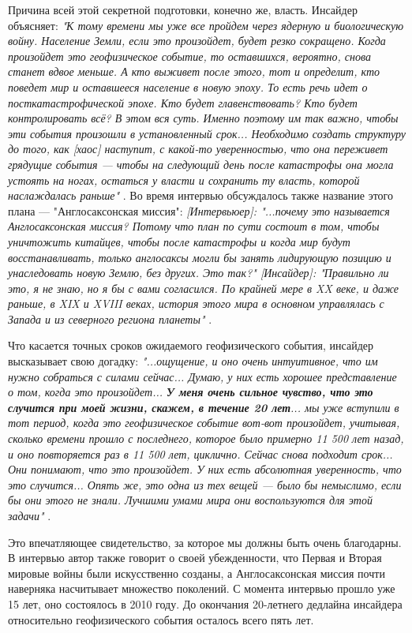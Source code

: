 \documentclass[10pt,twocolumn,letterpaper]{article}
\begin{document}
Причина всей этой секретной подготовки, конечно же, власть. Инсайдер объясняет: \textit{"К тому времени мы уже все пройдем через ядерную и биологическую войну. Население Земли, если это произойдет, будет резко сокращено. Когда произойдет это геофизическое событие, то оставшихся, вероятно, снова станет вдвое меньше. А кто выживет после этого, тот и определит, кто поведет мир и оставшееся население в новую эпоху. То есть речь идет о посткатастрофической эпохе. Кто будет главенствовать? Кто будет контролировать всё? В этом вся суть. Именно поэтому им так важно, чтобы эти события произошли в установленный срок... Необходимо создать структуру до того, как [хаос] наступит, с какой-то уверенностью, что она переживет грядущие события — чтобы на следующий день после катастрофы она могла устоять на ногах, остаться у власти и сохранить ту власть, которой наслаждалась раньше"} \cite{4}. Во время интервью обсуждалось также название этого плана — "Англосаксонская миссия": \textit{[Интервьюер]: "...почему это называется Англосаксонская миссия? Потому что план по сути состоит в том, чтобы уничтожить китайцев, чтобы после катастрофы и когда мир будут восстанавливать, только англосаксы могли бы занять лидирующую позицию и унаследовать новую Землю, без других. Это так?" [Инсайдер]: "Правильно ли это, я не знаю, но я бы с вами согласился. По крайней мере в XX веке, и даже раньше, в XIX и XVIII веках, история этого мира в основном управлялась с Запада и из северного региона планеты"} \cite{4}.

Что касается точных сроков ожидаемого геофизического события, инсайдер высказывает свою догадку: \textit{"...ощущение, и оно очень интуитивное, что им нужно собраться с силами сейчас... Думаю, у них есть хорошее представление о том, когда это произойдет... \textbf{У меня очень сильное чувство, что это случится при моей жизни, скажем, в течение 20 лет}... мы уже вступили в тот период, когда это геофизическое событие вот-вот произойдет, учитывая, сколько времени прошло с последнего, которое было примерно 11 500 лет назад, и оно повторяется раз в 11 500 лет, циклично. Сейчас снова подходит срок... Они понимают, что это произойдет. У них есть абсолютная уверенность, что это случится... Опять же, это одна из тех вещей — было бы немыслимо, если бы они этого не знали. Лучшими умами мира они воспользуются для этой задачи"} \cite{4}.

Это впечатляющее свидетельство, за которое мы должны быть очень благодарны. В интервью автор также говорит о своей убежденности, что Первая и Вторая мировые войны были искусственно созданы, а Англосаксонская миссия почти наверняка насчитывает множество поколений. С момента интервью прошло уже 15 лет, оно состоялось в 2010 году. До окончания 20-летнего дедлайна инсайдера относительно геофизического события осталось всего пять лет.
\end{document}
